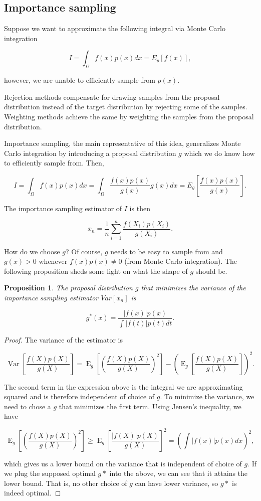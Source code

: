 \documentclass{book}
\theoremstyle{plain}%
\newtheorem{proposition}{Proposition}[section]
\theoremstyle{definition}
\DeclareMathOperator{\Var}{Var}
\DeclareMathOperator{\E}{E}
\begin{document}
\subsection*{Importance sampling}

Suppose we want to approximate the following integral via Monte Carlo integration

$$I = \int_\Omega f(x) p(x) dx = E_p[f(x)],$$

however, we are unable to efficiently sample from $p(x)$.

Rejection methods compensate for drawing samples from the proposal distribution instead of the target distribution by rejecting some of the samples. Weighting methods achieve the same by weighting the samples from the proposal distribution. 

Importance sampling, the main representative of this idea, generalizes Monte Carlo integration by introducing a proposal distribution $g$ which we do know how to efficiently sample from. Then, 

$$I = \int_\Omega f(x) p(x) dx = \int_\Omega \frac{f(x) p(x)}{g(x)} g(x) dx = E_g[\frac{f(x) p(x)}{g(x)}].$$

The importance sampling estimator of $I$ is then

$$x_n = \frac{1}{n}\sum_{i=1}^n \frac{f(X_i) p(X_i)}{g(X_i)}.$$

How do we choose $g$? Of course, $g$ needs to be easy to sample from and $g(x) > 0$ whenever $f(x)p(x) \neq 0$ (from Monte Carlo integration). The following proposition sheds some light on what the shape of $g$ should be.

\begin{proposition} The proposal distribution $g$ that minimizes the variance of the importance sampling estimator $Var[x_n]$ is

$$g^*(x) = \frac{|f(x)|p(x)}{\int |f(t)|p(t)dt}.$$
\end{proposition}

\begin{proof} The variance of the estimator is

$$\Var[\frac{f(X)p(X)}{g(X)}] = \E_g[(\frac{f(X)p(X)}{g(X)})^2] - (\E_g[\frac{f(X)p(X)}{g(X)}])^2.$$

The second term in the expression above is the integral we are approximating squared and is therefore independent of choice of $g$. To minimize the variance, we need to chose a $g$ that minimizes the first term. Using Jensen's inequality, we have

$$\E_g\left[(\frac{f(X)p(X)}{g(X)})^2\right] \geq \E_g\left[\frac{|f(X)|p(X)}{g(X)}\right]^2 = \left(\int |f(x)|p(x)dx\right)^2,$$

which gives us a lower bound on the variance that is independent of choice of $g$. If we plug the supposed optimal $g*$ into the above, we can see that it attains the lower bound. That is, no other choice of $g$ can have lower variance, so $g*$ is indeed optimal.

\end{proof}
\end{document}
